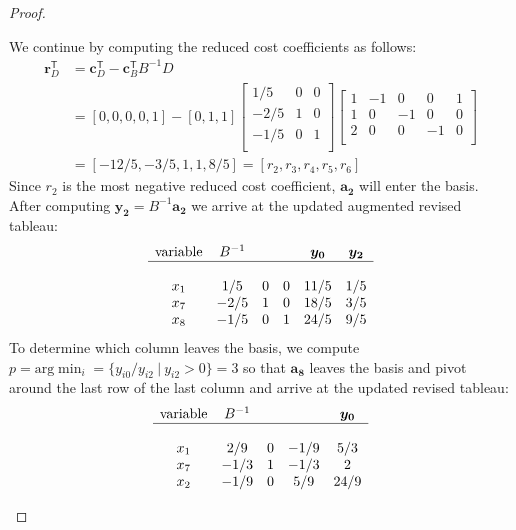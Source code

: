 \documentclass[12pt]{article}
\theoremstyle{definition}
\newcommand{\vect}[1]{\boldsymbol{#1}}
\newcommand{\tran}{\mathsf{T}}
\begin{document}
\begin{proof}
\begin{enumerate}
      We continue by computing the reduced cost coefficients as follows:
      \begin{align*}
        \vect{r}_D^\tran &= \vect{c}_D^\tran - \vect{c}_B^\tran B^{-1} D \\
        &= [0, 0, 0, 0, 1] - [0, 1, 1]
        \begin{bmatrix}
          1/5 & 0 & 0 \\
          -2/5 & 1 & 0\\
          -1/5 & 0 & 1\\
        \end{bmatrix}
        \begin{bmatrix}
          1 & -1 & 0 & 0 & 1\\
          1 & 0 & -1 & 0 & 0\\
          2 & 0 & 0 & -1 & 0\\
        \end{bmatrix} \\
        &= [-12/5, -3/5, 1, 1, 8/5] = [r_2, r_3, r_4, r_5, r_6]
      \end{align*}
      Since $r_2$ is the most negative reduced cost coefficient, $\vect{a_2}$
      will enter the basis. After computing $\vect{y_2} = B^{-1}\vect{a_2}$ we
      arrive at the updated augmented revised tableau:
      \begin{align*}
        \begin{matrix}
          \text{variable} & B^{-1} & & & \vect{y_0} & \vect{y_2}\\
          \hline \\
          x_1 & 1/5 & 0 & 0 & 11/5 & 1/5\\
          x_7 & -2/5 & 1 & 0 & 18/5 & 3/5\\
          x_8 & -1/5 & 0 & 1 & 24/5 & 9/5\\
        \end{matrix}
      \end{align*}
      To determine which column leaves the basis, we compute
      $p = \text{arg}\min_i = \{y_{i0} / y_{i2} \ | \ y_{i2} > 0\} = 3$ so that $\vect{a_8}$
      leaves the basis and pivot
      around the last row of the last column and arrive at the updated revised tableau:
      \begin{align*}
        \begin{matrix}
          \text{variable} & B^{-1} & & & \vect{y_0}\\
          \hline \\
          x_1 & 2/9 & 0 & -1/9 & 5/3\\
          x_7 & -1/3 & 1 & -1/3 & 2\\
          x_2 & -1/9 & 0 & 5/9 & 24/9\\
        \end{matrix}
      \end{align*}


\end{enumerate}
\end{proof}
\end{document}
